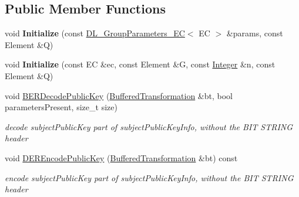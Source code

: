 \subsection*{Public Member Functions}
\begin{DoxyCompactItemize}
\item 
\hypertarget{class_d_l___public_key___e_c_ab4b56ecf99dd7e273ebe586ccc2a0b74}{
void {\bfseries Initialize} (const \hyperlink{class_d_l___group_parameters___e_c}{DL\_\-GroupParameters\_\-EC}$<$ EC $>$ \&params, const Element \&Q)}
\label{class_d_l___public_key___e_c_ab4b56ecf99dd7e273ebe586ccc2a0b74}

\item 
\hypertarget{class_d_l___public_key___e_c_a8d03b8c7cba896822f5410f6ccc8a71f}{
void {\bfseries Initialize} (const EC \&ec, const Element \&G, const \hyperlink{class_integer}{Integer} \&n, const Element \&Q)}
\label{class_d_l___public_key___e_c_a8d03b8c7cba896822f5410f6ccc8a71f}

\item 
\hypertarget{class_d_l___public_key___e_c_ab436957725e2d94340f3de56b1260109}{
void \hyperlink{class_d_l___public_key___e_c_ab436957725e2d94340f3de56b1260109}{BERDecodePublicKey} (\hyperlink{class_buffered_transformation}{BufferedTransformation} \&bt, bool parametersPresent, size\_\-t size)}
\label{class_d_l___public_key___e_c_ab436957725e2d94340f3de56b1260109}

\begin{DoxyCompactList}\small\item\em decode subjectPublicKey part of subjectPublicKeyInfo, without the BIT STRING header \item\end{DoxyCompactList}\item 
\hypertarget{class_d_l___public_key___e_c_a8ab4bc2bb34c0572cbba3e5830bd64a7}{
void \hyperlink{class_d_l___public_key___e_c_a8ab4bc2bb34c0572cbba3e5830bd64a7}{DEREncodePublicKey} (\hyperlink{class_buffered_transformation}{BufferedTransformation} \&bt) const }
\label{class_d_l___public_key___e_c_a8ab4bc2bb34c0572cbba3e5830bd64a7}

\begin{DoxyCompactList}\small\item\em encode subjectPublicKey part of subjectPublicKeyInfo, without the BIT STRING header \item\end{DoxyCompactList}\end{DoxyCompactItemize}


